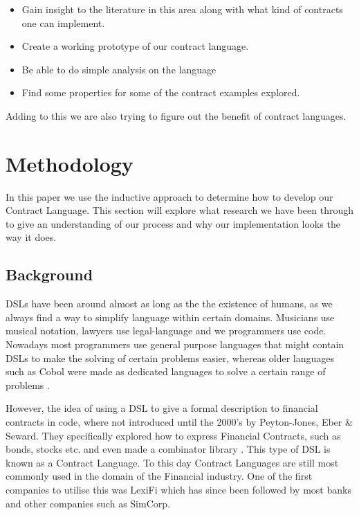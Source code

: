 \documentclass{ituthesis}
\begin{document}
\begin{itemize}
    \item Gain insight to the literature in this area along with what kind of contracts one can implement.
    \item Create a working prototype of our contract language.
    \item Be able to do simple analysis on the language
    \item Find some properties for some of the contract examples explored.
\end{itemize}

Adding to this we are also trying to figure out the benefit of contract languages.


\chapter{Methodology}


In this paper we use the inductive approach to determine how to develop our Contract Language. This section will explore what research we have been through to give an understanding of our process and why our implementation looks the way it does.

\section{Background}
DSLs have been around almost as long as the the existence of humans, as we always find a way to simplify language within certain domains. Musicians use musical notation, lawyers use legal-language and we programmers use code. Nowadays most programmers use general purpose languages that might contain DSLs to make the solving of certain problems easier, whereas older languages such as Cobol were made as dedicated languages to solve a certain range of problems \cite{van2000domain}.

However, the idea of using a DSL to give a formal description to financial contracts in code, where not introduced until the 2000's by Peyton-Jones, Eber \& Seward. They specifically explored how to express Financial Contracts, such as bonds, stocks etc. and even made a combinator library \cite{peyton2000composing}. This type of DSL is known as a Contract Language. To this day Contract Languages are still most commonly used in the domain of the Financial industry. One of the first companies to utilise this was LexiFi which has since been followed by most banks and other companies such as SimCorp.
\end{document}
